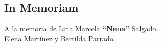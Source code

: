 \begin{flushright}
\section*{In Memoriam}
{\large A la memoria de Lina Marcela {\bf ``Nena''} Salgado,\\
Elena Martínez y Bertilda Parrado.}
\end{flushright}
